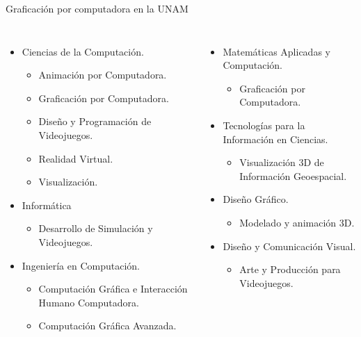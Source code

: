 \begin{frame}{Graficación por computadora en la UNAM}
\begin{columns}
\begin{itemize}
    \item Ciencias de la Computación.
    \begin{itemize}
        \item Animación por Computadora.
        \item Graficación por Computadora.
        \item Diseño y Programación de Videojuegos.
        \item Realidad Virtual.
        \item Visualización.
    \end{itemize}
    \item Informática
    \begin{itemize}
        \item Desarrollo de Simulación y Videojuegos.
    \end{itemize}
    \item Ingeniería en Computación.
    \begin{itemize}
        \item Computación Gráfica e Interacción Humano Computadora.
        \item Computación Gráfica Avanzada.
    \end{itemize}
\end{itemize}
\begin{itemize}
    \item Matemáticas Aplicadas y Computación.
    \begin{itemize}
        \item Graficación por Computadora.
    \end{itemize}
    \item Tecnologías para la Información en Ciencias.
    \begin{itemize}
        \item Visualización 3D de Información Geoespacial.
    \end{itemize}
    \item Diseño Gráfico.
    \begin{itemize}
        \item Modelado y animación 3D.
    \end{itemize}
    \item Diseño y Comunicación Visual.
    \begin{itemize}
        \item Arte y Producción para Videojuegos.
    \end{itemize}
\end{itemize}
\end{columns}
\end{frame}

